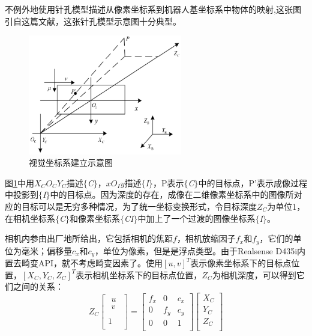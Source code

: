 \documentclass[fontset=fandol,type=bachelor,campus=harbin]{hithesisbook}
\begin{document}
不例外地使用针孔模型描述从像素坐标系到机器人基坐标系中物体的映射,这张图引自这篇文献\cite{zh1}，这张针孔模型示意图十分典型。
\begin{figure}[h]
\centering
\includegraphics[width = 0.60\textwidth]{chapter2/视觉坐标系建立}
\caption{视觉坐标系建立示意图}
\label{视觉坐标系建立}
\end{figure}


图\ref{视觉坐标系建立}中用$X_CO_CY_C$描述$\lbrace$\textit{C}$\rbrace$，$xO_Iy$描述$\lbrace$\textit{I}$\rbrace$，P表示$\lbrace$\textit{C}$\rbrace$中的目标点，P'表示成像过程中投影到$\lbrace$\textit{I}$\rbrace$中的目标点。因为深度的存在，成像在二维像素坐标系中的图像所对应的目标可以是无穷多种情况，为了统一坐标变换形式，令目标深度$Z_C$为单位1，在相机坐标系$\lbrace$\textit{C}$\rbrace$和像素坐标系$\lbrace$\textit{CI}$\rbrace$中加上了一个过渡的图像坐标系$\lbrace$\textit{I}$\rbrace$。


相机内参由出厂地所给出，它包括相机的焦距$f$，相机放缩因子$f_x$和$f_y$，它们的单位为毫米；偏移量$c_x$和$c_y$，单位为像素，但是是浮点类型。由于Realsense D435i内置去畸变API，就不考虑畸变因素了。使用$\left[ u,v \right] ^T$表示像素坐标系下的目标点位置，$\left[ X_C,Y_C,Z_C \right] ^T$表示相机坐标系下的目标点位置，$Z_C$为相机深度，可以得到它们之间的关系：
\begin{equation}
	Z_C\left[ \begin{array}{c}
	\begin{array}{c}
	u\\
	v\\
\end{array}\\
	1\\
\end{array} \right] =\left[ \begin{matrix}
	f_x&		0&		c_x\\
	0&		f_y&		c_y\\
	0&		0&		1\\
\end{matrix} \right] \left[ \begin{array}{c}
	X_C\\
	Y_C\\
	Z_C\\
\end{array} \right] 
\label{像素到相机坐标变换} 
\end{equation} 
\end{document}
